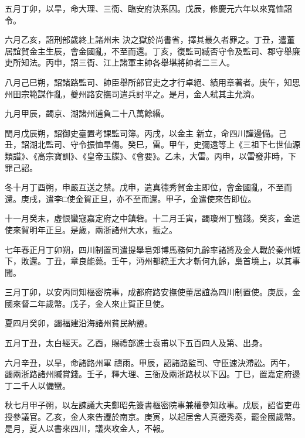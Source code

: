 \begin{pinyinscope}
 五月丁卯，以旱，命大理、三衙、臨安府決系囚。戊辰，修慶元六年以來寬恤詔令。



 六月乙亥，詔刑部歲終上諸州未
 決之獄於尚書省，擇其最久者罪之。丁丑，遣董居誼賀金主生辰，會金國亂，不至而還。丁亥，復監司臧否守令及監司、郡守舉廉吏所知法。丙申，詔三衙、江上諸軍主帥各舉堪將帥者二三人。



 八月己巳朔，詔諸路監司、帥臣舉所部官吏之才行卓絕、績用章著者。庚午，知思州田宗範謀作亂，夔州路安撫司遣兵討平之。是月，金人弒其主允濟。



 九月甲辰，蠲京、湖諸州逋負二十八萬餘緡。



 閏月戊辰朔，詔御史臺置考課監司簿。丙戌，以金主
 新立，命四川謹邊備。己丑，詔湖北監司、守令振恤旱傷。癸巳，雷。甲午，史彌遠等上《三祖下七世仙源類譜》、《高宗寶訓》、《皇帝玉牒》、《會要》。乙未，大雷。丙申，以雷發非時，下罪己詔。



 冬十月丁酉朔，申嚴互送之禁。戊申，遣真德秀賀金主即位，會金國亂，不至而還。庚戌，遣李□使金賀正旦，亦不至而還。甲子，金遣使來告即位。



 十一月癸未，虛恨蠻寇嘉定府之中鎮砦。十二月壬寅，蠲瓊州丁鹽錢。癸亥，金遣使來賀明年正旦。是歲，兩浙諸州大水，振之。



 七年春正月丁卯朔，四川制置司遣提舉皂郊博馬務何九齡率諸將及金人戰於秦州城下，敗還。丁丑，章良能薨。壬午，沔州都統王大才斬何九齡，梟首境上，以其事聞。



 三月丁卯，以安丙同知樞密院事，成都府路安撫使董居誼為四川制置使。庚辰，金國來督二年歲幣。戊子，金人來止賀正旦使。



 夏四月癸卯，蠲福建沿海諸州貧民納鹽。



 五月丁丑，太白經天。乙酉，賜禮部進士袁甫以下五百四人及第、出身。



 六月辛丑，以旱，命諸路州軍
 禱雨。甲辰，詔諸路監司、守臣速決滯訟。丙午，蠲兩浙路諸州贓賞錢。壬子，釋大理、三衙及兩浙路杖以下囚。丁巳，置嘉定府邊丁二千人以備蠻。



 秋七月甲子朔，以左諫議大夫鄭昭先簽書樞密院事兼權參知政事。戊辰，詔省吏毋授參議官。乙亥，金人來告遷於南京。庚寅，以起居舍人真德秀奏，罷金國歲幣。是月，夏人以書來四川，議夾攻金人，不報。




\end{pinyinscope}
